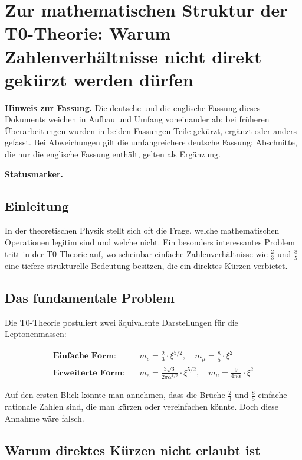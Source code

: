 \section*{Zur mathematischen Struktur der T0-Theorie: Warum Zahlenverhältnisse nicht direkt gekürzt werden dürfen}

	\medskip\noindent\textbf{Hinweis zur Fassung.} Die deutsche und die englische Fassung dieses Dokuments weichen in Aufbau und Umfang voneinander ab; bei früheren Überarbeitungen wurden in beiden Fassungen Teile gekürzt, ergänzt oder anders gefasst. Bei Abweichungen gilt die umfangreichere deutsche Fassung; Abschnitte, die nur die englische Fassung enthält, gelten als Ergänzung.

	
	\medskip\noindent\textbf{Statusmarker.}
	

	
	\subsection*{Einleitung}
	
	In der theoretischen Physik stellt sich oft die Frage, welche mathematischen Operationen legitim sind und welche nicht. Ein besonders interessantes Problem tritt in der T0-Theorie auf, wo scheinbar einfache Zahlenverhältnisse wie $\frac{2}{3}$ und $\frac{8}{5}$ eine tiefere strukturelle Bedeutung besitzen, die ein direktes Kürzen verbietet.
	
	\subsection*{Das fundamentale Problem}
	
	Die T0-Theorie postuliert zwei äquivalente Darstellungen für die Leptonenmassen:
	
	\begin{align*}
		\textbf{Einfache Form:} &\quad m_e = \frac{2}{3} \cdot \xi^{5/2}, \quad m_\mu = \frac{8}{5} \cdot \xi^2 \\
		\textbf{Erweiterte Form:} &\quad m_e = \frac{3\sqrt{3}}{2\pi\alpha^{1/2}} \cdot \xi^{5/2}, \quad m_\mu = \frac{9}{4\pi\alpha} \cdot \xi^2
	\end{align*}
	
	Auf den ersten Blick könnte man annehmen, dass die Brüche $\frac{2}{3}$ und $\frac{8}{5}$ einfache rationale Zahlen sind, die man kürzen oder vereinfachen könnte. Doch diese Annahme wäre falsch.
	
	\subsection*{Warum direktes Kürzen nicht erlaubt ist}
	
